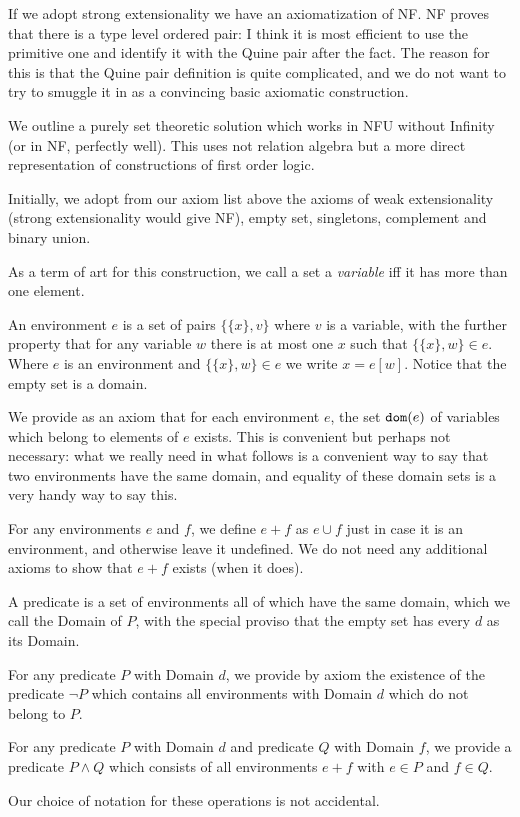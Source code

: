 \documentclass{slides}
\begin{document}
\begin{slide}
If we adopt strong extensionality we have an axiomatization of NF.  NF proves that there is a type level ordered pair:  I think it is most efficient to use the primitive one and identify it with the Quine pair after the fact.  The reason for this is that the Quine pair definition is quite complicated, and we do not want to try to smuggle it in as a convincing basic axiomatic construction.

\end{slide}

\begin{slide}

We outline a purely set theoretic solution which works in NFU without Infinity (or in NF, perfectly well).  This uses not relation algebra
but a more direct representation of constructions of first order logic.

Initially, we adopt from our axiom list above the axioms of weak extensionality (strong extensionality would give NF), empty set, singletons, complement and binary union.

As a term of art for this construction, we call a set a {\em variable\/} iff it has more than one element.

An environment $e$  is a set of pairs $\{\{x\},v\}$ where $v$ is a variable, with the further property that for any variable $w$ there
is at most one $x$ such that $\{\{x\},w\}\in e$.  Where $e$ is an environment and $\{\{x\},w\}\in e$ we write $x=e[w]$.  Notice that
the empty set is a domain.

We provide as an axiom that for each environment $e$, the set ${\tt dom}(e)$ of variables which belong to elements of $e$ exists.
This is convenient but perhaps not necessary:  what we really need in what follows is a convenient way to say that two environments
have the same domain, and equality of these domain sets is a very handy way to say this.

\end{slide}

\begin{slide}

For any environments $e$ and $f$, we define $e+f$ as $e\cup f$ just in case it is an environment, and otherwise leave it undefined.
We do not need any additional axioms to show that $e+f$ exists (when it does).

A predicate is a set of environments all of which have the same domain, which we call the Domain of $P$, with the special proviso
that the empty set has every $d$ as its Domain.

For any predicate $P$ with Domain $d$, we provide by axiom the existence of the predicate $\neg P$ which contains all environments
with Domain $d$ which do not belong to $P$.

For any predicate $P$ with Domain $d$ and predicate $Q$ with Domain $f$, we provide a predicate $P \wedge Q$ which consists of
all environments $e+f$ with $e \in P$ and $f \in Q$.

Our choice of notation for these operations is not accidental.

\end{slide}
\end{document}
